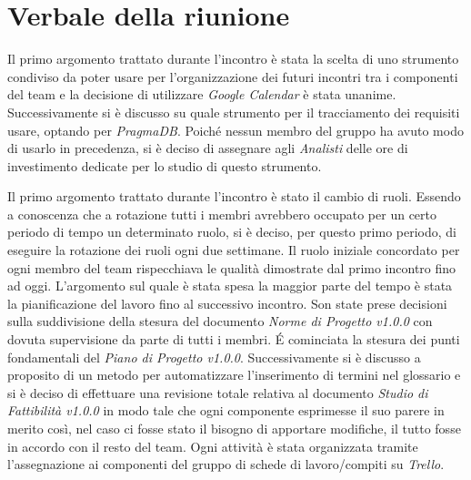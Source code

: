 \section{Verbale della riunione}
Il primo argomento trattato durante l'incontro è stata la scelta di uno strumento 
condiviso da poter usare per l'organizzazione dei futuri incontri tra i componenti
del team e la decisione di utilizzare \textit{Google Calendar} è stata unanime.
Successivamente si è discusso su quale strumento per il tracciamento dei requisiti
usare, optando per \textit{PragmaDB}\glo{}. Poiché nessun membro del gruppo ha 
avuto modo di usarlo in precedenza, si è deciso di assegnare agli \textit{Analisti}
delle ore di investimento dedicate per lo studio di questo strumento. 

Il primo argomento trattato durante l'incontro è stato il cambio di ruoli.
Essendo a conoscenza che a rotazione tutti i membri avrebbero occupato per un 
certo periodo di tempo un determinato ruolo, si è deciso, per questo primo periodo, di 
eseguire la rotazione dei ruoli ogni due settimane. Il ruolo iniziale concordato 
per ogni membro del team rispecchiava le qualità dimostrate dal primo incontro 
fino ad oggi.
\newline \newline
L'argomento sul quale è stata spesa la maggior parte del tempo è stata la 
pianificazione del lavoro fino al successivo incontro. Son state prese decisioni 
sulla suddivisione della stesura del documento \textit{Norme di Progetto v1.0.0} con dovuta supervisione 
da parte di tutti i membri. \'E cominciata la stesura dei punti fondamentali del 
\textit{Piano di Progetto v1.0.0}. Successivamente si è discusso a proposito di 
un metodo per automatizzare l'inserimento di termini nel glossario e si è 
deciso di effettuare una revisione totale relativa al documento \textit{Studio di
Fattibilità v1.0.0} in modo tale che ogni componente esprimesse il suo parere in 
merito così, nel caso ci fosse stato il bisogno di apportare modifiche, il tutto 
fosse in accordo con il resto del team. Ogni attività è stata organizzata 
tramite l'assegnazione ai componenti del gruppo di schede di lavoro/compiti su 
\textit{Trello}. \\

\pagebreak

